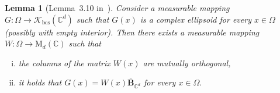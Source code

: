 \documentclass{article}
\newtheorem{lemma}[theorem]{Lemma}
\theoremstyle{definition}
\theoremstyle{remark}
\numberwithin{equation}{section}
\newcommand{\cK}{\mathcal{K}}
\newcommand{\complex}{\mathbb{C}}
\newcommand{\convex}{\cK_{\mathrm{bcs}}}
\newcommand{\1}{\mathbf{1}}
\newcommand{\matrices}[2]{\mathrm{M}_{{#1}}({#2})}
\newcommand{\complexball}[1]{\mathbf{\overline{B}}_{\complex^{{#1}}}}
\begin{document}
    \begin{lemma}[Lemma~3.10 in~\cite{Cruz_Uribe_Bownik_Extrapolation}]
        \label{lemma:JohnEllipsoidMatrix}
        Consider a measurable mapping $G\colon \Omega \rightarrow \convex(\complex^d)$
        such that $G(x)$ is a complex ellipsoid for every $x \in \Omega$
        (possibly with empty interior).
        Then there exists a measurable mapping $W\colon \Omega \rightarrow \matrices{d}{\complex}$ such that
        \begin{enumerate}[(i)]
            \item
            the columns of the matrix $W(x)$ are mutually orthogonal,
            \item 
            it holds that $G(x) = W(x) \complexball{d}$ for every $x \in \Omega.$
        \end{enumerate}
    \end{lemma}

\end{document}
